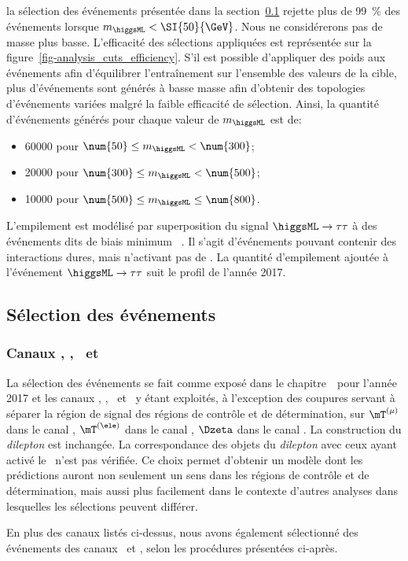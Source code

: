 la sélection des événements présentée dans la section~\ref{chapter-ML-section-evt_gen-selection} rejette plus de \SI{99}{\%} des événements lorsque $m_{\higgsML} < \SI{50}{\GeV}$.
Nous ne considérerons pas de masse plus basse.
L'efficacité des sélections appliquées est représentée sur la figure~\ref{fig-analysis_cuts_efficiency}.
S'il est possible d'appliquer des poids aux événements afin d'équilibrer l'entraînement sur l'ensemble des valeurs de la cible,
plus d'événements sont générés à basse masse afin d'obtenir des topologies d'événements variées malgré la faible efficacité de sélection.
Ainsi, la quantité d'événements générés pour chaque valeur de $m_{\higgsML}$ est de:
\begin{itemize}
\item \num{60000} pour $ \num{50} \leq m_{\higgsML} < \num{300} $;
\item \num{20000} pour $ \num{300} \leq m_{\higgsML} < \num{500} $;
\item \num{10000} pour $ \num{500} \leq m_{\higgsML} \leq \num{800}$.
\end{itemize}
\par
L'empilement est modélisé par superposition du signal $\higgsML\to\tau\tau$ à des événements dits de \og biais minimum \fg~\cite{pythia8.2}.
Il s'agit d'événements pouvant contenir des interactions dures, mais n'activant pas de \HLTpath.
La quantité d'empilement ajoutée à l'événement $\higgsML\to\tau\tau$ suit le profil de l'année 2017.
\subsection{Sélection des événements}\label{chapter-ML-section-evt_gen-selection}
\subsubsection{Canaux \tauh\tauh, \mu\tauh, \ele\tauh\ et \ele\mu}
La sélection des événements se fait comme exposé dans le chapitre~\ pour l'année 2017 et les canaux
\tauh\tauh, \mu\tauh, \ele\tauh\ et \ele\mu\ y étant exploités,
à l'exception des coupures servant à séparer la région de signal des régions de contrôle et de détermination, sur
$\mT^{(\mu)}$ dans le canal \mu\tauh,
$\mT^{(\ele)}$ dans le canal \ele\tauh,
$\Dzeta$ dans le canal \ele\mu.
La construction du \emph{dilepton} est inchangée.
La correspondance des objets du \emph{dilepton} avec ceux ayant activé le \HLTpath\ n'est pas vérifiée.
Ce choix permet d'obtenir un modèle dont les prédictions auront non seulement un sens dans les régions de contrôle et de détermination, mais aussi plus facilement dans le contexte d'autres analyses dans lesquelles les sélections peuvent différer.
\par
En plus des canaux listés ci-dessus, nous avons également sélectionné des événements des canaux \mu\mu\ et \ele\ele,
selon les procédures présentées ci-après.
\renewcommand{\IfMoreOnePair}{Si plus d'une paire possible existe dans l'événement, une seule est retenue selon la logique exposée dans le chapitre~\refChHTT.}
